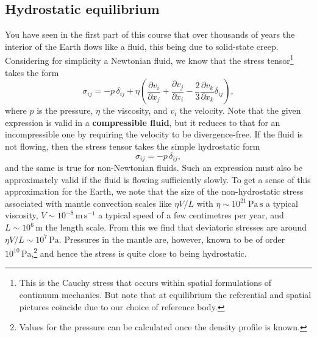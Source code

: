\subsection*{Hydrostatic equilibrium}
You have seen in the first part of this course that over thousands of years the interior of the Earth flows 
like a fluid, this being due to solid-state creep. Considering for simplicity a Newtonian fluid, we know that the 
stress tensor\footnote{This is the Cauchy stress that occurs within spatial formulations of continuum mechanics. But note that 
at equilibrium the referential and spatial pictures coincide due to our choice of reference body.} takes the form
\begin{equation}
\sigma_{ij}=-p\,\delta_{ij}+\eta\left(\frac{\partial v_{i}}{\partial x_{j}}+\frac{\partial v_{j}}{\partial x_{i}}-\frac{2}{3}\frac{\partial v_{k}}{\partial x_{k}}\delta_{ij}\right),
\label{eq:3}
\end{equation}
where $p$ is the pressure, $\eta$ the viscosity, and $v_{i}$ the velocity. Note that the given expression is valid in a 
\textbf{compressible fluid}, but it reduces to that for an incompressible one by requiring the velocity to be divergence-free. 
If the fluid is not flowing, then the stress tensor takes the simple hydrostatic form
\begin{equation}
\sigma_{ij}=-p\,\delta_{ij},
\label{eq:4}
\end{equation}
and the same is true for non-Newtonian fluids. Such an expression must also be approximately valid if the fluid is flowing 
sufficiently slowly. To get a sense of this approximation for the Earth, we note that the size of the non-hydrostatic 
stress associated with mantle convection scales like $\eta V/L$ with $\eta\sim10^{21}\,\mathrm{Pa\,s}$ a typical viscosity, $V\sim10^{-8}\,\mathrm{m\,s^{-1}}$ a 
typical speed of a few centimetres per year, and $L\sim10^{6}\,\mathrm{m}$ the length scale. From this we find that deviatoric stresses are 
around $\eta V/L\sim10^{7}\,\mathrm{Pa}$. Pressures in the mantle are, however, known to be of order $10^{10}\,\mathrm{Pa}$,\footnote{Values for the 
pressure can be calculated once the density profile is known.} and hence the stress is quite close to being hydrostatic.

